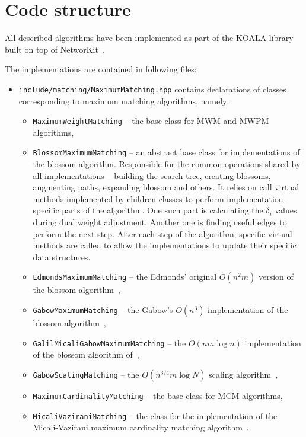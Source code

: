 \section{Code structure}

All described algorithms have been implemented as part of the KOALA library~\cite{koala-networkit} built on top of NetworKit~\cite{networkit}. 

The implementations are contained in following files:

\begin{itemize}
    \item \texttt{include/matching/MaximumMatching.hpp} contains declarations of classes corresponding to maximum matching algorithms, namely: \begin{itemize}
        \item \texttt{MaximumWeightMatching} – the base class for \textsc{MWM} and \textsc{MWPM} algorithms,
        \item \texttt{BlossomMaximumMatching} – an abstract base class for implementations of the blossom algorithm. Responsible for the common operations shared by all implementations – building the search tree, creating blossoms, augmenting paths, expanding blossom and others. It relies on call virtual methods implemented by children classes to perform implementation-specific parts of the algorithm. One such part is calculating the $\delta_i$ values during dual weight adjustment. Another one is finding useful edges to perform the next step. After each step of the algorithm, specific virtual methods are called to allow the implementations to update their specific data structures.
        \item \texttt{EdmondsMaximumMatching} – the Edmonds' original $O(n^2m)$ version of the blossom algorithm~\cite{edmonds1965maximum},
        \item \texttt{GabowMaximumMatching} – the Gabow's $O(n^3)$ implementation of the blossom algorithm~\cite{gabow1974implementation},
        \item \texttt{GalilMicaliGabowMaximumMatching} – the $O(nm\log n)$ implementation of the blossom algorithm of~\cite{galil1986ev},
        \item \texttt{GabowScalingMatching} – the $O(n^{3/4}m\log N)$ scaling algorithm~\cite{gabow1984scaling},
        \item \texttt{MaximumCardinalityMatching} – the base class for \textsc{MCM} algorithms,
        \item \texttt{MicaliVaziraniMatching} – the class for the implementation of the Micali-Vazirani maximum cardinality matching algorithm~\cite{micali1980v}.

\end{itemize}
\end{itemize}
